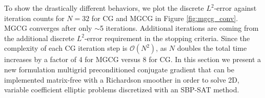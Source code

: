 To show the drastically different behaviors, we plot the discrete $\mathit{L}^2$-error against iteration counts for $N = 32$ for CG and MGCG in Figure \ref{fig:mgcg_conv}.
MGCG converges after only $\sim$5 iterations. Additional iterations are coming from the additional discrete $\mathit{L}^2$-error requirement in the stopping criteria.
Since the complexity of each CG iteration step is $\mathcal{O}(N^2)$, as $N$ doubles the total time increases by a factor of 4 for MGCG versus 8 for CG. 
In this section we present a new formulation multigrid preconditioned conjugate gradient that can be implemented matrix-free with a Richardson smoother in order to solve 2D, variable coefficient elliptic problems discretized with an SBP-SAT method. 



